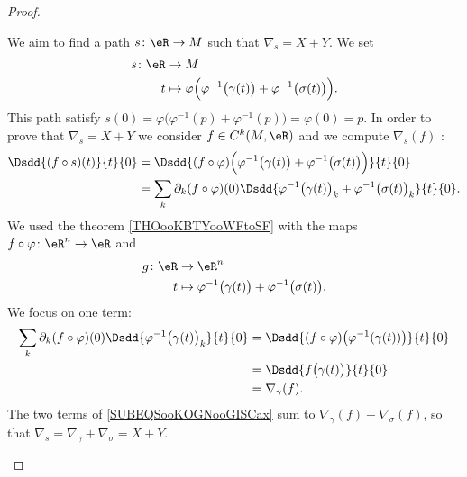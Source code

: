\begin{proof}
\begin{subproof}
    We aim to find a path \( s\colon \eR\to M\) such that \( \nabla_s=X+Y\). We set
    \begin{equation}        \label{EQooYNAOooKkKmxo}
        \begin{aligned}
            s\colon \eR&\to M \\
            t&\mapsto \varphi\Big( \varphi^{-1}\big( \gamma(t) \big)+\varphi^{-1}\big( \sigma(t) \big) \Big). 
        \end{aligned}
    \end{equation}
    This path satisfy \( s(0)=\varphi\Big( \varphi^{-1}(p)+\varphi^{-1}(p) \Big)=\varphi(0)=p\). In order to prove that \( \nabla_s=X+Y\) we consider \( f\in C^k(M,\eR)\) and we compute \( \nabla_s(f)\) :
    \begin{subequations}        \label{SUBEQSooKOGNooGISCax}
        \begin{align}
            \Dsdd{ (f\circ s)(t) }{t}{0}&=\Dsdd{ (f\circ\varphi)\Big( \varphi^{-1}\big( \gamma(t) \big)+\varphi^{-1}\big( \sigma(t) \big) \Big) }{t}{0}\\
            &=\sum_k\partial_k(f\circ \varphi)(0)\Dsdd{ \varphi^{-1}\big( \gamma(t) \big)_k+\varphi^{-1}\big( \sigma(t) \big)_k }{t}{0}.
        \end{align}
    \end{subequations}
    We used the theorem \ref{THOooKBTYooWFtoSF} with the maps \( f\circ \varphi\colon \eR^n\to \eR\) and
    \begin{equation}
        \begin{aligned}
            g\colon \eR&\to \eR^n \\
            t&\mapsto \varphi^{-1}\big( \gamma(t) \big)+\varphi^{-1}\big( \sigma(t) \big). 
        \end{aligned}
    \end{equation}
    We focus on one term:
    \begin{subequations}
        \begin{align}
            \sum_k\partial_k(f\circ \varphi)(0)\Dsdd{ \varphi^{-1}\big( \gamma(t) \big)_k }{t}{0} &=\Dsdd{ (f\circ\varphi)\big( \varphi^{-1}(\gamma(t)) \big) }{t}{0}\\
            &=\Dsdd{ f\big( \gamma(t) \big) }{t}{0}\\
            &=\nabla_{\gamma}(f).
        \end{align}
    \end{subequations}
    The two terms of \eqref{SUBEQSooKOGNooGISCax} sum to \( \nabla_{\gamma}(f)+\nabla_{\sigma}(f)\), so that \( \nabla_s=\nabla_{\gamma}+\nabla_{\sigma}=X+Y\).


\end{subproof}
\end{proof}
